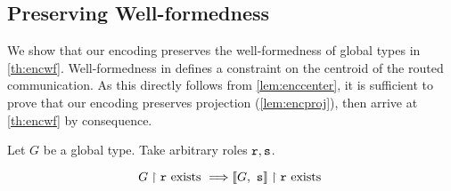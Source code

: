 \subsection{Preserving Well-formedness}
\label{subsection:encodepreservewf}

We show that our encoding preserves the well-formedness
of global types in \cref{th:encwf}.
Well-formedness in \newtheory defines a constraint
on the centroid of the routed communication.
As this directly follows from \cref{lem:enccenter},
it is sufficient to prove that our encoding preserves
projection (\cref{lem:encproj}), then arrive at \cref{th:encwf}
by consequence.

\begin{lemma}
Let $G$ be a global type.
Take arbitrary roles ${\mathtt{r}}, {\mathtt{s}}$.

\[
{G} \upharpoonright {\mathtt{r}} \text{ exists } 
	\Longrightarrow 
{  \llbracket {G},~ {\mathtt{s}}  \rrbracket  } \upharpoonright {\mathtt{r}} \text{ exists }
\]

\label{lem:encproj}
\end{lemma}

